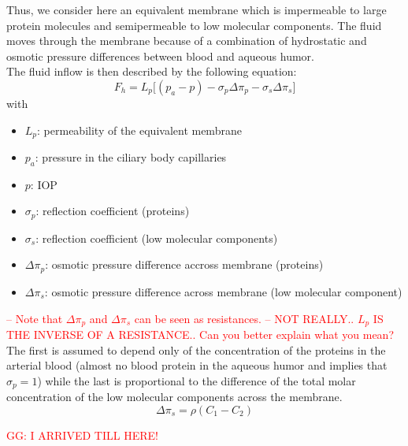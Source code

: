 \documentclass[english,12pt]{article}
\begin{document}
Thus, we consider here an equivalent membrane which is impermeable to large protein molecules and semipermeable to low molecular components. The fluid moves through the membrane because of a combination of hydrostatic and osmotic pressure differences between blood and aqueous humor.\\
The fluid inflow is then described by the following equation:
\begin{equation}
F_{h}= L_p \big[ (p_a-p)-\sigma_{p} \Delta\pi_{p}-\sigma_{s} \Delta\pi_{s}\big]
\label{e3}
\end{equation}
with
\begin{itemize}
\item $L_p$: permeability of the equivalent membrane
\item $p_a$: pressure in the ciliary body capillaries
\item $p$: IOP
\item $\sigma_p$: reflection coefficient (proteins)
\item $\sigma_s$: reflection coefficient (low molecular components)
\item $\Delta \pi_p $: osmotic pressure difference accross membrane (proteins)
\item $\Delta \pi_s $: osmotic pressure difference across membrane (low molecular component)
\end{itemize}
\textcolor{red}{-- Note that $\Delta \pi_p $ and $\Delta \pi_s $ can be seen as resistances. -- NOT REALLY.. $L_p$ IS THE INVERSE OF A RESISTANCE.. Can you better explain what you mean?}
The first is assumed to depend only of the concentration of the proteins in the arterial blood (almost no blood protein in the aqueous humor and implies that $\sigma_p=1$) while the last is proportional to the difference of the total molar concentration of the low molecular components across the membrane.
\begin{equation}
\Delta\pi_{s}= \rho(C_1-C_{2})
\label{e4}
\end{equation}

\textcolor{red}{GG: I ARRIVED TILL HERE!}
\end{document}
